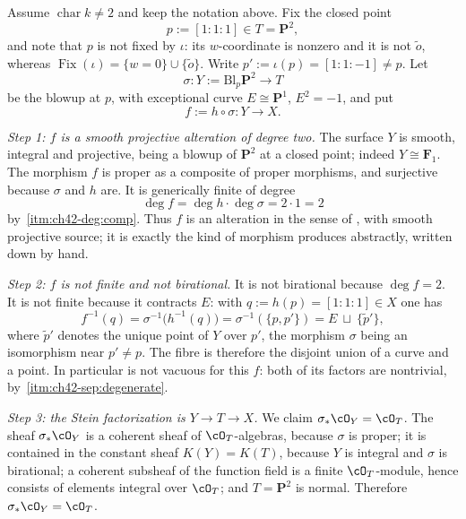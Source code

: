\begin{example}
\label{ex:ch42-cone-stein}
Assume $\operatorname{char}k\ne2$ and keep the notation above.  Fix the
closed point
\[
 p:=[1:1:1]\in T=\mathbf P^2,
\]
and note that $p$ is not fixed by $\iota$: its $w$-coordinate is
nonzero and it is not $\tilde o$, whereas
$\operatorname{Fix}(\iota)=\{w=0\}\cup\{\tilde o\}$.  Write
$p':=\iota(p)=[1:1:-1]\ne p$.  Let
\[
 \sigma:Y:=\mathrm{Bl}_p\mathbf P^2\longrightarrow T
\]
be the blowup at $p$, with exceptional curve $E\cong\mathbf P^1$,
$E^2=-1$, and put
\[
 f:=h\circ\sigma:Y\longrightarrow X .
\]

\emph{Step 1: $f$ is a smooth projective alteration of degree two.}
The surface $Y$ is smooth, integral and projective, being a blowup of
$\mathbf P^2$ at a closed point; indeed $Y\cong\mathbf F_1$.  The
morphism $f$ is proper as a composite of proper morphisms, and surjective
because $\sigma$ and $h$ are.  It is generically finite of degree
\[
 \deg f=\deg h\cdot\deg\sigma=2\cdot1=2
\]
by \,\cref{itm:ch42-deg:comp}.  Thus $f$ is
an alteration in the sense of , with smooth
projective source; it is exactly the kind of morphism
 produces abstractly, written down by hand.

\emph{Step 2: $f$ is not finite and not birational.}
It is not birational because $\deg f=2$.  It is not finite because it
contracts $E$: with $q:=h(p)=[1:1:1]\in X$ one has
\[
 f^{-1}(q)=\sigma^{-1}\bigl(h^{-1}(q)\bigr)
          =\sigma^{-1}(\{p,p'\})
          =E\ \sqcup\ \{\tilde p'\},
\]
where $\tilde p'$ denotes the unique point of $Y$ over $p'$, the
morphism $\sigma$ being an isomorphism near $p'\ne p$.  The fibre is
therefore the disjoint union of a curve and a point.  In particular
 is not vacuous for this $f$: both of its
factors are nontrivial, by
\,\cref{itm:ch42-sep:degenerate}.

\emph{Step 3: the Stein factorization is $Y\to T\to X$.}
We claim $\sigma_*\cO_Y=\cO_T$.  The sheaf $\sigma_*\cO_Y$ is a coherent
sheaf of $\cO_T$-algebras, because $\sigma$ is proper; it is contained in
the constant sheaf $K(Y)=K(T)$, because $Y$ is integral and $\sigma$ is
birational; a coherent subsheaf of the function field is a finite
$\cO_T$-module, hence consists of elements integral over $\cO_T$; and
$T=\mathbf P^2$ is normal.  Therefore $\sigma_*\cO_Y=\cO_T$.


\end{example}
